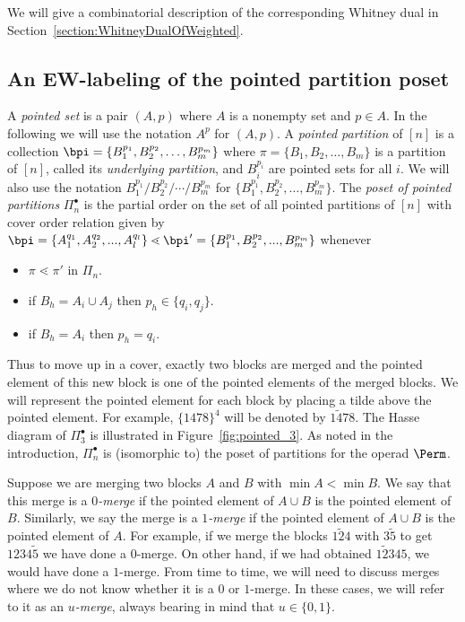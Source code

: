 We will give a combinatorial description of the corresponding Whitney dual in Section~\ref{section:WhitneyDualOfWeighted}.

\subsection{An EW-labeling of the pointed partition poset}\label{sec:EWLabOfPointPart}

A \emph{pointed set} is a pair $(A,p)$ where $A$ is a nonempty set and $p\in A$. In the following we will use the notation $A^p$ for   $(A,p)$.  A \textit{pointed partition} of $[n]$ is a collection $\bpi=\{B_1^{p_1},B_2^{p_2},\dots,B_m^{p_m}\}$ where $\pi=\{B_1,B_2,\dots,B_m\}$ is a partition of $[n]$, called its \emph{underlying partition}, and $B_i^{p_i}$ are pointed sets for all $i$.
We will also use the notation $B_1^{p_1}/B_2^{p_2}/\cdots/ B_m^{p_m}$ for $ \{B_1^{p_1},B_2^{p_2},\dots,B_m^{p_m}\}$. The \emph{poset of pointed partitions} $\Pi_{n}^{\bullet}$ is the partial order on the set of all pointed partitions of $[n]$ with cover order relation given by $\bpi=\{A_1^{q_1},A_2^{q_2},...,A_l^{q_l}\}\lessdot \bpi'=\{B_1^{p_1},B_2^{p_2},...,B_m^{p_m}\}$   whenever

\begin{itemize}
  \item $\pi\lessdot \pi'$ in $\Pi_n$.
  \item if $B_h=A_i\cup A_j$ then $p_h \in \{q_i,q_j\}$.
  \item if $B_h=A_i$ then $p_h=q_i$.
\end{itemize}
Thus to move up in a cover, exactly two blocks are merged and the pointed element of this new block is one of the pointed elements of the merged blocks.  We will represent the pointed element for each block by placing a tilde above the pointed element. For example, $\{1478\}^4$ will be denoted by $1\tilde{4}78$. The Hasse diagram of $\Pi_3^{\bullet}$ is illustrated in Figure~\ref{fig:pointed_3}. As noted in the introduction,  $\Pi_n^\bullet$ is (isomorphic to) the poset of partitions for the operad  $\Perm$.

Suppose we are merging two blocks $A$ and $B$ with $\min A< \min B$. We say that this merge is a  \emph{$0$-merge} if the pointed element of $A\cup B$ is the pointed element of~$B$. Similarly, we say the merge is a \emph{$1$-merge} if the pointed element of $A\cup B$ is the pointed element of $A$.  For example, if we merge the blocks $1\tilde{2}4$ with $3\tilde{5}$ to get $1234\tilde{5}$ we have done a $0$-merge.  On other hand, if we had obtained $1\tilde{2}345$, we would have done a $1$-merge.  From time to time, we will need to discuss merges where we do not know whether it is a $0$ or $1$-merge. In these cases, we will refer to it as an \emph{$u$-merge}, always bearing in mind that $u\in \{0,1\}$.   


